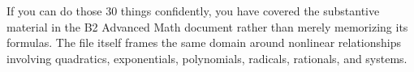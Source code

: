 \documentclass[
]{article}
\begin{document}
If you can do those 30 things confidently, you have covered the
substantive material in the B2 Advanced Math document rather than merely
memorizing its formulas. The file itself frames the same domain around
nonlinear relationships involving quadratics, exponentials, polynomials,
radicals, rationals, and systems.
\end{document}

